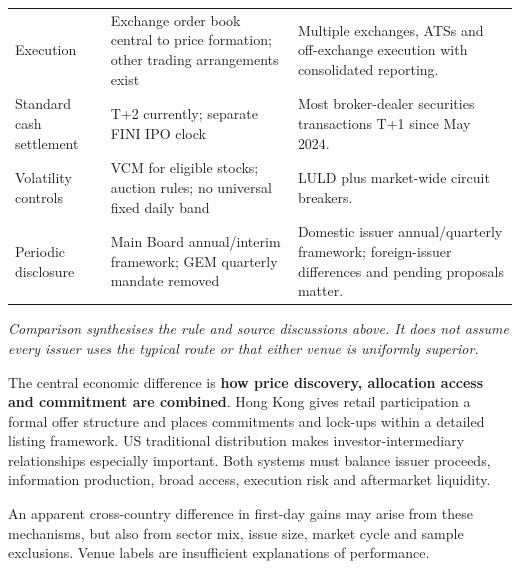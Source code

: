\documentclass[11pt,a4paper]{article}
\begin{document}
\begin{longtable}{@{}L{3.0cm}L{6.25cm}L{6.25cm}@{}}
Execution & Exchange order book central to price formation; other trading arrangements exist & Multiple exchanges, ATSs and off-exchange execution with consolidated reporting.\\
Standard cash settlement & T+2 currently; separate FINI IPO clock & Most broker-dealer securities transactions T+1 since May 2024.\\
Volatility controls & VCM for eligible stocks; auction rules; no universal fixed daily band & LULD plus market-wide circuit breakers.\\
Periodic disclosure & Main Board annual/interim framework; GEM quarterly mandate removed & Domestic issuer annual/quarterly framework; foreign-issuer differences and pending proposals matter.\\
\bottomrule
\end{longtable}
\textit{Comparison synthesises the rule and source discussions above. It does not assume every issuer uses the typical route or that either venue is uniformly superior.}

The central economic difference is \textbf{how price discovery, allocation access and commitment are combined}. Hong Kong gives retail participation a formal offer structure and places commitments and lock-ups within a detailed listing framework. US traditional distribution makes investor-intermediary relationships especially important. Both systems must balance issuer proceeds, information production, broad access, execution risk and aftermarket liquidity.

An apparent cross-country difference in first-day gains may arise from these mechanisms, but also from sector mix, issue size, market cycle and sample exclusions. Venue labels are insufficient explanations of performance.
\end{document}
